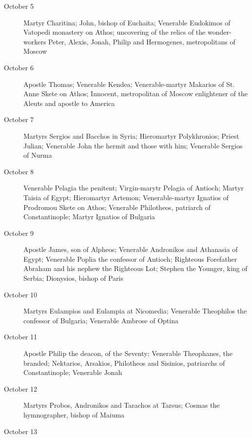 \begin{description}
\item[October 5]

Martyr Charitina; John, bishop of Euchaita; Venerable Eudokimos of Vatopedi monastery on Athos; uncovering of the relics of the wonder-workers Peter, Alexis, Jonah, Philip and Hermogenes, metropolitans of Moscow

\item[October 6]

Apostle Thomas; Venerable Kendea; Venerable-martyr Makarios of St. Anne Skete on Athos; Innocent, metropolitan of Moscow enlightener of the Aleuts and apostle to America

\item[October 7]

Martyrs Sergios and Bacchos in Syria; Hieromartyr Polykhronios; Priest Julian; Venerable John the hermit and those with him; Venerable Sergios of Nurma

\item[October 8]

Venerable Pelagia the penitent; Virgin-marytr Pelagia of Antioch; Martyr Taisia of Egypt; Hieromartyr Artemon; Venerable-martyr Ignatios of Prodromou Skete on Athos; Venerable Philotheos, patriarch of Constantinople; Martyr Ignatios of Bulgaria

\item[October 9]

Apostle James, son of Alpheos; Venerable Andronikos and Athanasia of Egypt; Venerable Poplia the confessor of Antioch; Righteous Forefather Abraham and his nephew the Righteous Lot; Stephen the Younger, king of Serbia; Dionysios, bishop of Paris

\item[October 10]

Martyrs Eulampios and Eulampia at Nicomedia; Venerable Theophilos the confessor of Bulgaria; Venerable Ambrose of Optina

\item[October 11]

Apostle Philip the deacon, of the Seventy; Venerable Theophanes, the branded; Nektarios, Arsakios, Philotheos and Sisinios, patriarchs of Constantinople; Venerable Jonah

\item[October 12]

Martyrs Probos, Andronikos and Tarachos at Tarsus; Cosmas the hymnographer, bishop of Maiuma

\item[October 13]


\end{description}
